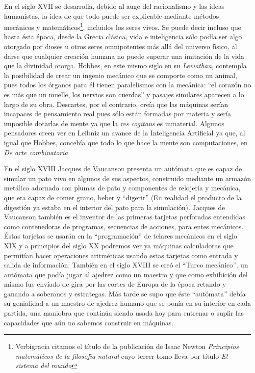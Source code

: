 \documentclass[12pt]{memoir}
\begin{document}
En el siglo XVII se desarrolla, debido al auge del racionalismo y las ideas humanistas, la idea de que todo puede ser explicable mediante métodos mecánicos y matemáticos\footnote{Verbigracia citamos el título de la publicación de Isaac Newton \textit{Principios matemáticos de la filosofía natural} cuyo tercer tomo lleva por título \textit{El sistema del mundo}}, incluidos los seres vivos. Se puede decir incluso que hasta ésta época, desde la Grecia clásica, vida e inteligencia sólo podía ser algo otorgado por dioses u otros seres omnipotentes más allá del universo físico, al darse que cualquier creación humana no puede superar una imitación de la vida que la divinidad otorga. Hobbes, en este mismo siglo en su \textit{Leviathan}, contempla la posibilidad de crear un ingenio mecánico que se comporte como un animal, pues todos los órganos para él tienen paralelismos con la mecánica: ``el corazón no es más que un muelle, los nervios son cuerdas'' y pasajes similares aparecen a lo largo de su obra. Descartes, por el contrario, creía que las máquinas serían incapaces de pensamiento real pues sólo están formadas por materia y sería imposible dotarlas de mente ya que la \textit{res cogitans} es inmaterial. Algunos pensadores creen ver en Leibniz un avance de la Inteligencia Artificial ya que, al igual que Hobbes, concebía que todo lo que hace la mente son computaciones, en \textit{De arte combinatoria}. 

En el siglo XVIII Jacques de Vaucanson presenta un autómata que es capaz de simular un pato vivo en algunos de sus aspectos, construido mediante un armazón metálico adornado con plumas de pato y componentes de relojería y mecánica, que era capaz de comer grano, beber y ``digerir'' (En realidad el producto de la digestión ya estaba en el interior del pato para la simulación). Jacques de Vaucanson también es el inventor de las primeras tarjetas perforadas entendidas como contenedoras de programas, secuencias de acciones, para entes mecánicos. Éstas tarjetas se usarán en la ``programación'' de telares mecánicos en el siglo XIX y a principios del siglo XX podremos ver ya máquinas calculadoras que permitían hacer operaciones aritméticas usando estas tarjetas como entrada y salida de información. También en el siglo XVIII se creó el ``Turco mecánico'', un autómata que podía jugar al ajedrez como un maestro y que como exhibición del mismo fue enviado de gira por las cortes de Europa de la época retando y ganando a soberanos y estrategas. Más tarde se supo que éste ``autómata'' debía su genialidad a un maestro de ajedrez humano que se ponía en su interior en cada partida, una maniobra que continúa siendo usada hoy para entrenar o suplir las capacidades que aún no sabemos construir en máquinas.
\end{document}
